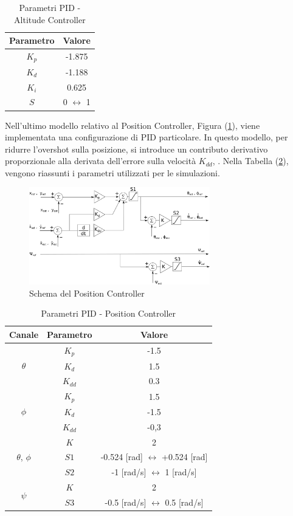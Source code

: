 \begin{table}
	\centering
	\caption{Parametri PID - Altitude Controller}
	\begin{tabular}{c c}
		\hline
		Parametro & Valore \\
		\hline
		$K_p$ & -1.875 \\
		$K_d$ & -1.188\\
		$K_i$ & 0.625\\
		$S$ & 0 $\leftrightarrow$ 1\\
		\hline
	\end{tabular}	
	\label{tab:PIDALT}
\end{table}

Nell'ultimo modello relativo al Position Controller, Figura (\ref{fig:PIDPosCTR}), viene implementata una configurazione di PID particolare. In questo modello, per ridurre l'overshot sulla posizione, si introduce un contributo derivativo proporzionale alla derivata dell'errore sulla velocità $K_{dd}$, \cite{DesTestCarm}. Nella Tabella (\ref{tab:PIDPOS}), vengono riassunti i parametri utilizzati per le simulazioni. 

\begin{figure}
	\centering
	\includegraphics[width=0.7\textwidth]{SistemaQuadrirotore/Figure/PIDPositionCtrl}
	\caption{Schema del Position Controller}
	\label{fig:PIDPosCTR}
\end{figure}

\begin{table}
	\centering
	\caption{Parametri PID - Position Controller}
	\begin{tabular}{c c c}
		\hline
		 Canale & Parametro & Valore \\
		\hline
		\multirow{3}{*}{$\theta$}&$K_p$ & -1.5 \\
		&$K_d$ & 1.5\\
		&$K_{dd}$ & 0.3\\
		\hline
		\multirow{3}{*}{$\phi$}& $K_p$ & 1.5 \\
		&$K_d$ & -1.5\\
		&$K_{dd}$ & -0,3\\
		\hline
		\multirow{3}{*}{$\theta$, $\phi$}&$K$ & 2 \\ 
		&$S1$ & -0.524 [rad] $\leftrightarrow$ +0.524 [rad]\\
		&$S2$ & -1 [rad/s] $\leftrightarrow$ 1  [rad/s]\\
		\hline
		\multirow{2}{*}{$\psi$}&$K$ & 2 \\
		&$S3$ & -0.5 [rad/s] $\leftrightarrow$ 0.5 [rad/s]\\
		\hline
		
	\end{tabular}	
	\label{tab:PIDPOS}
\end{table}

